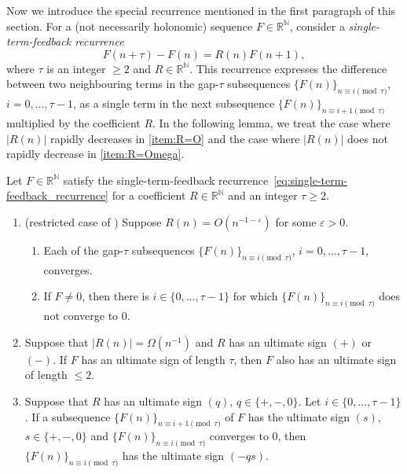 \documentclass[a4paper,UKenglish,cleveref,autoref,thm-restate]{lipics-v2021}
\newcommand{\R}{\mathbb{R}}
\newcommand{\N}{\mathbb{N}}
\begin{document}
Now we introduce the special recurrence mentioned in the first paragraph of this section. 
For a (not necessarily holonomic) sequence $F \in \R^{\N}$, consider a 
\emph{single-term-feedback recurrence} 
    \begin{equation} \label{eq:single-term-feedback_recurrence}
    F(n+\tau) - F(n) = R(n) F(n+1), 
    \end{equation}
where $\tau$ is an integer $\geq 2$ and $R \in \R^{\N}$.
This recurrence expresses the difference between two neighbouring terms in the gap-$\tau$ subsequences $\{ F(n) \}_{n \equiv i \pmod{\tau}}$, $i = 0, \dots, \tau-1$, as a single term in the next subsequence $\{ F(n) \}_{n \equiv i+1 \pmod{\tau}}$ multiplied by the coefficient $R$. 
In the following lemma, we treat the case where $|R(n)|$ rapidly decreases in \eqref{item:R=O} and the case where $|R(n)|$ does not rapidly decrease in \eqref{item:R=Omega}.


\begin{lemma} \label{lem:single-term-feedback_recurrence}
Let $F \in \R^{\N}$ satisfy the single-term-feedback recurrence~\eqref{eq:single-term-feedback_recurrence} for a coefficient $R \in \R^{\N}$ and an integer $\tau \geq 2$. 
\begin{enumerate}[(1)]
\item \label{item:R=O}
(restricted case of \cite[Theorem~6]{Koo91})
Suppose $R(n) = O(n^{-1-\varepsilon})$ for some $\varepsilon > 0$. 
\begin{enumerate}[(\ref{item:R=O}a)]
\item \label{item:F_converge}
Each of the gap-$\tau$ subsequences $\{ F(n) \}_{n \equiv i \pmod{\tau}}$, $i = 0, \dots, \tau-1$, converges. 
\item \label{item:limFneq0} 
If $F \neq 0$, then there is $i \in \{ 0, \dots, \tau-1 \}$
for which $\{ F(n) \}_{n \equiv i \pmod{\tau}}$ does not converge to $0$.  
\end{enumerate}

\item \label{item:R=Omega} 
Suppose that $|R(n)| = \Omega(n^{-1})$ and $R$ has an ultimate sign $(+)$ or $(-)$. If $F$ has an ultimate sign of length $\tau$, then $F$ also has an ultimate sign of length $\leq 2$. 

\item \label{item:zero_convergence_sign}
Suppose that $R$ has an ultimate sign $(q)$, $q \in \{ +, -, 0 \}$. 
Let $i \in \{ 0, \dots, \tau-1 \}$. 
If a subsequence $\{ F(n) \}_{n \equiv i+1 \pmod{\tau}}$ of $F$
has the ultimate sign $(s)$, $s \in \{ +, -, 0 \}$
and 
$\{ F(n) \}_{n \equiv i \pmod{\tau}}$ converges to $0$, then $\{ F(n) \}_{n \equiv i \pmod{\tau}}$ has the ultimate sign $(-qs)$. 
\end{enumerate}
\end{lemma}
\end{document}
